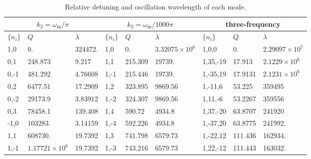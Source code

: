 \documentclass[%
reprint,
 amsmath,amssymb,
 aps,
]{revtex4-1}
\begin{document}
\begin{table}
\caption{\label{tab-q-values-lambda-each-mode-interference}Relative detuning and oscillation wavelength of each mode.} 
\begin{ruledtabular} 
\begin{tabular}{lll|lll|lll} 
 \multicolumn{3}{c|}{$k_2=\omega_{\mathrm m}/\pi$} & \multicolumn{3}{c|}{$k_2=\omega_{\mathrm{m}}/1000\pi$} & \multicolumn{3}{c}{three-frequency} \\
\hline
   $\{n_i\}$ & $Q$ & $\lambda$ & $\{n_i\}$ & $Q$ & $\lambda$ & $\{n_i\}$ & $Q$ & $\lambda$  \\
\hline 
 {1,0} &	0.  &     324472.    & {1,0} &	0.  &   $3.32075\times 10^6$       & {1,0,0} &	0. &  $2.29097\times10^7$   \\
{0,1} &	248.873 &   9.217      &  {1,1} &	215.309 &    19739.     &   {1,35,-19} &	17.913  & $2.1229\times 10^6$  \\
{0,-1} &	481.292 &   4.76608    & {1,-1} &	215.446 &    19739.        &  {1,-35,19} &	17.9131 &  $2.1231\times 10^6$  \\
{0,2} &	6477.51 &     17.2909       & {1,2} &	323.895 &   9869.56          & {1,-11,6} &	53.225 &  359495  \\
{0,-2} &	29173.9 &    3.83912     & {1,-2} &	324.307  &    9869.56      &   {1,11,-6} &	53.2267   &      359556  \\
{0,3} &	78458.1  &      139.408       &{1,4}  &	590.72   &     4934.8     &  {1,37,-20}  &	63.8707 & 241920 \\
{-1,0} &	103283. &    3.14159      & {1,-4}  &	592.226  &     4934.8      & {1,-37,20} &	63.8775 & 241992. \\
{1,1} &	608730.  &       19.7392      &  {1,3}  &	741.798  &   6579.73        &  {1,-22,12} &	111.436 &    162934.\\
{1,-1} &	$1.17721\times10^6$  &    19.7392      & {1,-3} &	743.216 &     6579.73        & {1,22,-12} &	111.443  & 163032.\\
\end{tabular} 
\end{ruledtabular} 
\end{table}
\end{document}
